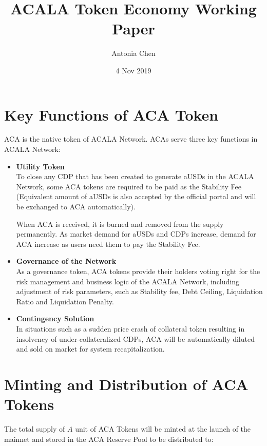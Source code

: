 \documentclass{article}
\title{ACALA Token Economy Working Paper}
\author{Antonia Chen}
\date{4 Nov 2019}
\begin{document}
\maketitle


\section{Key Functions of ACA Token}
ACA is the native token of ACALA Network. ACAs serve three key functions in ACALA Network:

\begin{itemize}
    \item \textbf{Utility Token} \\
    To close any CDP that has been created to generate aUSDs in the ACALA Network, some ACA tokens are required to be paid as the Stability Fee (Equivalent amount of aUSDs is also accepted by the official portal and will be exchanged to ACA automatically).
    
    When ACA is received, it is burned and removed from the supply permanently. As market demand for aUSDs and CDPs increase, demand for ACA increase as users need them to pay the Stability Fee. 
    
    \item \textbf{Governance of the Network} \\
    As a governance token, ACA tokens provide their holders voting right for the risk management and business logic of the ACALA Network, including adjustment of risk parameters, such as Stability fee, Debt Ceiling, Liquidation Ratio and Liquidation Penalty. 

    \item \textbf{Contingency Solution} \\
     In situations such as a sudden price crash of collateral token resulting in insolvency of under-collateralized CDPs, ACA will be automatically diluted and sold on market for system recapitalization.
    
\end{itemize}

\section{Minting and Distribution of ACA Tokens}
The total supply of $A$ unit of ACA Tokens will be minted at the launch of the mainnet and stored in the ACA Reserve Pool to be distributed to:
\end{document}
